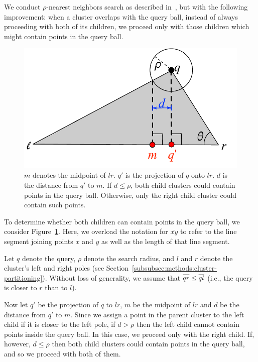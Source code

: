 We conduct $\rho$-nearest neighbors search as described in~\cite{ishaq2019clustered}, but with the following improvement:
when a cluster overlaps with the query ball, instead of always proceeding with both of its children, we proceed only with those children which might contain points in the query ball.

\begin{figure}[ht!]
    \centering
    \includegraphics[scale=0.5]{images/geometry/overlapping-children-3.pdf}
    \caption{
        $m$ denotes the midpoint of $\overline{l r}$. $q'$ is the projection of $q$ onto $\overline{l r}$.
        $d$ is the distance from $q'$ to $m$.
        If $d \leq \rho$, both child clusters could contain points in the query ball.
        Otherwise, only the right child cluster could contain such points. 
    }
    \label{fig:methods:overlapping-children-3}
\end{figure}

To determine whether both children can contain points in the query ball, we consider Figure~\ref{fig:methods:overlapping-children-3}.
Here, we overload the notation for $\overline{x y}$ to refer to the line segment joining points $x$ and $y$ as well as the length of that line segment.

Let $q$ denote the query, $\rho$ denote the search radius, and $l$ and $r$ denote the cluster's left and right poles (see Section~\ref{subsubsec:methods:cluster-partitioning}).
Without loss of generality, we assume that $\overline{q r \vphantom{l}} \leq \overline{q l}$ (i.e., the query is closer to $r$ than to $l$).

Now let $q'$ be the projection of $q$ to $\overline{l r}$, $m$ be the midpoint of $\overline{l r}$ and $d$ be the distance from $q'$ to $m$.
Since we assign a point in the parent cluster to the left child if it is closer to the left pole, if $d > \rho$ then the left child cannot contain points inside the query ball.
In this case, we proceed only with the right child.
If, however, $d \leq \rho$ then both child clusters could contain points in the query ball, and so we proceed with both of them.

